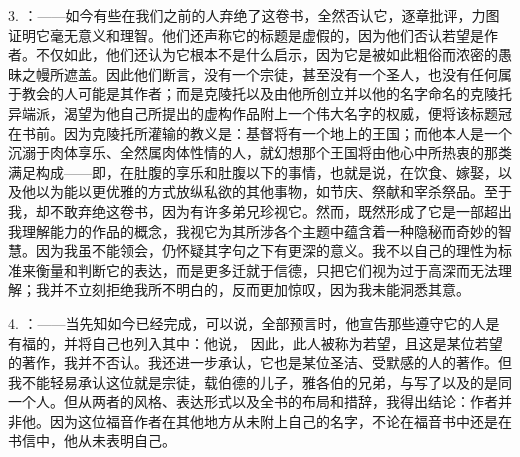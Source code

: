 3. ：——如今有些在我们之前的人弃绝了这卷书，全然否认它，逐章批评，力图证明它毫无意义和理智。他们还声称它的标题是虚假的，因为他们否认若望是作者。不仅如此，他们还认为它根本不是什么启示，因为它是被如此粗俗而浓密的愚昧之幔所遮盖。因此他们断言，没有一个宗徒，甚至没有一个圣人，也没有任何属于教会的人可能是其作者；而是克陵托以及由他所创立并以他的名字命名的克陵托异端派，渴望为他自己所提出的虚构作品附上一个伟大名字的权威，便将该标题冠在书前。因为克陵托所灌输的教义是：基督将有一个地上的王国；而他本人是一个沉溺于肉体享乐、全然属肉体性情的人，就幻想那个王国将由他心中所热衷的那类满足构成——即，在肚腹的享乐和肚腹以下的事情，也就是说，在饮食、嫁娶，以及他以为能以更优雅的方式放纵私欲的其他事物，如节庆、祭献和宰杀祭品。至于我，却不敢弃绝这卷书，因为有许多弟兄珍视它。然而，既然形成了它是一部超出我理解能力的作品的概念，我视它为其所涉各个主题中蕴含着一种隐秘而奇妙的智慧。因为我虽不能领会，仍怀疑其字句之下有更深的意义。我不以自己的理性为标准来衡量和判断它的表达，而是更多迁就于信德，只把它们视为过于高深而无法理解；我并不立刻拒绝我所不明白的，反而更加惊叹，因为我未能洞悉其意。\par

4. ：——当先知如今已经完成，可以说，全部预言时，他宣告那些遵守它的人是有福的，并将自己也列入其中：他说， 因此，此人被称为若望，且这是某位若望的著作，我并不否认。我还进一步承认，它也是某位圣洁、受默感的人的著作。但我不能轻易承认这位就是宗徒，载伯德的儿子，雅各伯的兄弟，与写了以及的是同一个人。但从两者的风格、表达形式以及全书的布局和措辞，我得出结论：作者并非他。因为这位福音作者在其他地方从未附上自己的名字，不论在福音书中还是在书信中，他从未表明自己。\par

